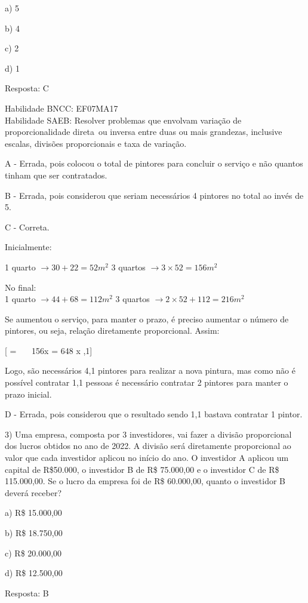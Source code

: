 a) 5

b) 4

c) 2

d) 1

Resposta: C

Habilidade BNCC: EF07MA17\\
Habilidade SAEB: Resolver problemas que envolvam variação de
proporcionalidade direta~ou inversa entre duas ou mais grandezas,
inclusive escalas, divisões proporcionais e taxa de variação.

A - Errada, pois colocou o total de pintores para concluir o serviço e
não quantos tinham que ser contratados.

B - Errada, pois considerou que seriam necessários 4 pintores no total
ao invés de 5.

C - Correta.

Inicialmente:

1 quarto \(\rightarrow 30 + 22 = 52m^{2}\) 3 quartos
\(\rightarrow 3 \times 52 = 156m^{2}\)

No final:\\
1 quarto \(\rightarrow 44 + 68 = 112m^{2}\) 3 quartos
\(\rightarrow 2 \times 52 + 112 = 216m^{2}\)

Se aumentou o serviço, para manter o prazo, é preciso aumentar o número
de pintores, ou seja, relação diretamente proporcional. Assim:

[ = \  \rightarrow \ \ 156x = 648 \rightarrow x ,1]

Logo, são necessários 4,1 pintores para realizar a nova pintura, mas
como não é possível contratar 1,1 pessoas é necessário contratar 2
pintores para manter o prazo inicial.

D - Errada, pois considerou que o resultado sendo 1,1 bastava contratar
1 pintor.

3) Uma empresa, composta por 3 investidores, vai fazer a divisão
proporcional dos lucros obtidos no ano de 2022. A divisão será
diretamente proporcional ao valor que cada investidor aplicou no início
do ano. O investidor A aplicou um capital de R\$50.000, o investidor B
de R\$ 75.000,00 e o investidor C de R\$ 115.000,00. Se o lucro da
empresa foi de R\$ 60.000,00, quanto o investidor B deverá receber?

a) R\$ 15.000,00

b) R\$ 18.750,00

c) R\$ 20.000,00

d) R\$ 12.500,00

Resposta: B

